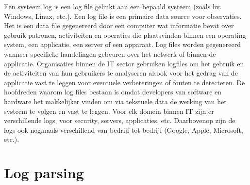 Een systeem log is een log file gelinkt aan een bepaald systeem (zoals bv. Windows, Linux, etc.). Een log file is een primaire data source voor observaties. Het is een data file gegenereerd door een computer wat informatie bevat over gebruik patronen, activiteiten en operaties die plaatsvinden binnen een operating system, een applicatie, een server of een apparaat. Log files worden gegenereerd wanneer specifieke handelingen gebeuren over het netwerk of binnen de applicatie. Organisaties binnen de IT sector gebruiken logfiles om het gebruik en de activiteiten van hun gebruikers te analyseren alsook voor het gedrag van de applicatie vast te leggen voor eventuele verbeteringen of fouten te detecteren. De hoofdreden waarom log files bestaan is omdat developers van software en hardware het makkelijker vinden om via tekstuele data de werking van het systeem te volgen en vast te leggen. Voor elk domein binnen IT zijn er verschillende logs, voor security, servers, applicaties, etc. Daarbovenop zijn de logs ook nogmaals verschillend van bedrijf tot bedrijf (Google, Apple, Microsoft, etc.).

\section{Log parsing}

